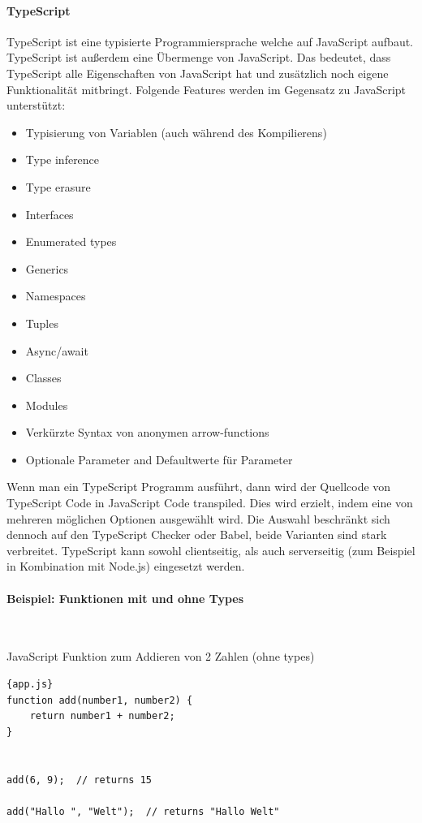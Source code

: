 \paragraph{TypeScript}
\label{TypeScript}
TypeScript ist eine typisierte Programmiersprache welche auf JavaScript aufbaut.
TypeScript ist außerdem eine Übermenge von JavaScript.
Das bedeutet, dass TypeScript alle Eigenschaften von JavaScript hat und zusätzlich noch eigene Funktionalität mitbringt.
Folgende Features werden im Gegensatz zu JavaScript unterstützt:

\begin{itemize}
    \item Typisierung von Variablen (auch während des Kompilierens)
    \item Type inference
    \item Type erasure
    \item Interfaces
    \item Enumerated types
    \item Generics
    \item Namespaces
    \item Tuples
    \item Async/await
    \item Classes
    \item Modules
    \item Verkürzte Syntax von anonymen arrow-functions
    \item Optionale Parameter and Defaultwerte für Parameter
\end{itemize}

Wenn man ein TypeScript Programm ausführt, dann wird der Quellcode von TypeScript Code in JavaScript Code transpiled.
Dies wird erzielt, indem eine von mehreren möglichen Optionen ausgewählt wird.
Die Auswahl beschränkt sich dennoch auf den TypeScript Checker oder Babel, beide Varianten sind stark verbreitet.
TypeScript kann sowohl clientseitig, als auch serverseitig (zum Beispiel in Kombination mit Node.js) eingesetzt werden.

\paragraph{Beispiel: Funktionen mit und ohne Types} \

JavaScript Funktion zum Addieren von 2 Zahlen (ohne types)
\begin{lstlisting}[label={lst:add-function-js}]{app.js}
function add(number1, number2) {
    return number1 + number2;
}


add(6, 9);  // returns 15

add("Hallo ", "Welt");  // returns "Hallo Welt"
\end{lstlisting}

